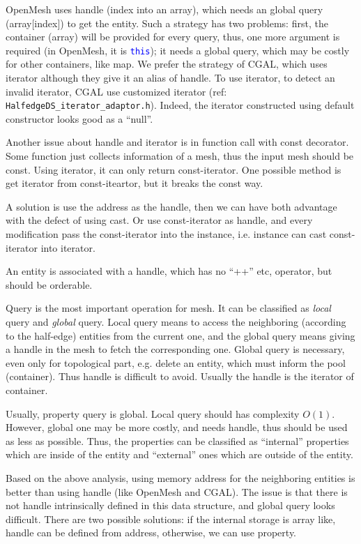 \documentclass[9pt,twocolumn]{extarticle}
\newcommand{\CODE}[1]{\textcolor{blue}{\tt #1}}
\begin{document}
OpenMesh uses handle (index into an array), which needs an global
query (array[index]) to get the entity. Such a strategy has two
problems: first, the container (array) will be provided for every
query, thus, one more argument is required (in OpenMesh, it is
\CODE{this}); it needs a global query, which may be costly for other
containers, like map.  We prefer the strategy of CGAL, which uses
iterator although they give it an alias of handle.  To use iterator,
to detect an invalid iterator, CGAL use customized iterator (ref:
\verb|HalfedgeDS_iterator_adaptor.h|).  Indeed, the iterator
constructed using default constructor looks good as a ``null''.

Another issue about handle and iterator is in function call with const
decorator.  Some function just collects information of a mesh, thus
the input mesh should be const.  Using iterator, it can only return
const-iterator.  One possible method is get iterator from
const-iteartor, but it breaks the const way.

A solution is use the address as the handle, then we can have both
advantage with the defect of using cast. Or use const-iterator as
handle, and every modification pass the const-iterator into the
instance, i.e. instance can cast const-iterator into iterator.

An entity is associated with a handle, which has no ``++'' etc,
operator, but should be orderable.

Query is the most important operation for mesh.  It can be classified
as {\em local} query and {\em global} query.  Local query means to
access the neighboring (according to the half-edge) entities from the
current one, and the global query means giving a handle in the mesh to
fetch the corresponding one.  Global query is necessary, even only for
topological part, e.g. delete an entity, which must inform the pool
(container).  Thus handle is difficult to avoid.  Usually the handle
is the iterator of container.

  Usually, property query is global.
Local query should has complexity $O(1)$. However, global one may be
more costly, and needs handle, thus should be used as less as
possible.  Thus, the properties can be classified as ``internal''
properties which are inside of the entity and ``external'' ones which
are outside of the entity.

Based on the above analysis, using memory address for the neighboring
entities is better than using handle (like OpenMesh and CGAL).  The
issue is that there is not handle intrinsically defined in this data
structure, and global query looks difficult.  There are two possible
solutions: if the internal storage is array like, handle can be
defined from address, otherwise, we can use property.
\end{document}
